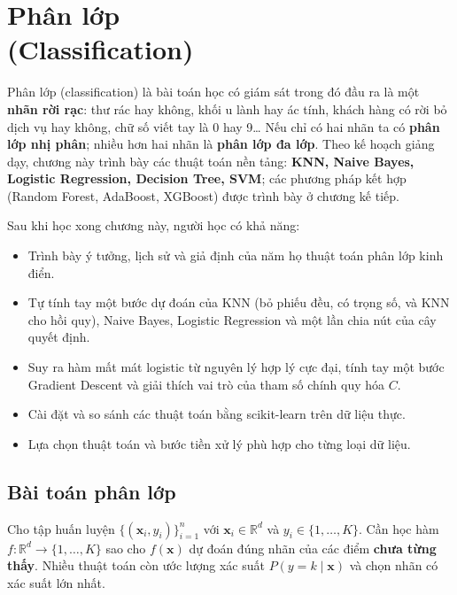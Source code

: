 
\chapter{Phân lớp \\ (Classification)}
\label{chap:classify}

Phân lớp (classification) là bài toán học có giám sát trong đó đầu ra là một \textbf{nhãn rời rạc}: thư rác hay không, khối u lành hay ác tính, khách hàng có rời bỏ dịch vụ hay không, chữ số viết tay là 0 hay 9\ldots{} Nếu chỉ có hai nhãn ta có \textbf{phân lớp nhị phân}; nhiều hơn hai nhãn là \textbf{phân lớp đa lớp}. Theo kế hoạch giảng dạy, chương này trình bày các thuật toán nền tảng: \textbf{KNN, Naive Bayes, Logistic Regression, Decision Tree, SVM}; các phương pháp kết hợp (Random Forest, AdaBoost, XGBoost) được trình bày ở chương kế tiếp.

\noindent Sau khi học xong chương này, người học có khả năng:
\begin{itemize}
    \item Trình bày ý tưởng, lịch sử và giả định của năm họ thuật toán phân lớp kinh điển.
    \item Tự tính tay một bước dự đoán của KNN (bỏ phiếu đều, có trọng số, và KNN cho hồi quy), Naive Bayes, Logistic Regression và một lần chia nút của cây quyết định.
    \item Suy ra hàm mất mát logistic từ nguyên lý hợp lý cực đại, tính tay một bước Gradient Descent và giải thích vai trò của tham số chính quy hóa $C$.
    \item Cài đặt và so sánh các thuật toán bằng scikit-learn trên dữ liệu thực.
    \item Lựa chọn thuật toán và bước tiền xử lý phù hợp cho từng loại dữ liệu.
\end{itemize}

\section{Bài toán phân lớp}

\begin{definition}
Cho tập huấn luyện $\{(\mathbf{x}_i, y_i)\}_{i=1}^{n}$ với $\mathbf{x}_i \in \mathbb{R}^d$ và $y_i \in \{1, \dots, K\}$. Cần học hàm $f: \mathbb{R}^d \to \{1, \dots, K\}$ sao cho $f(\mathbf{x})$ dự đoán đúng nhãn của các điểm \textbf{chưa từng thấy}. Nhiều thuật toán còn ước lượng xác suất $P(y = k \mid \mathbf{x})$ và chọn nhãn có xác suất lớn nhất.
\end{definition}

